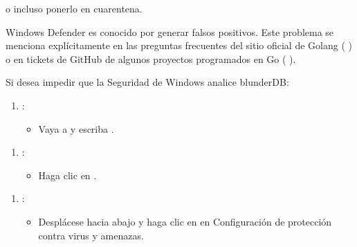 \documentclass[letterpaper,10pt,spanish]{sphinxmanual}
\begin{document}
\begin{figure}[htbp]
\centering

\noindent{}
\end{figure}

\sphinxAtStartPar
o incluso ponerlo en cuarentena.

\sphinxAtStartPar
Windows Defender es conocido por generar falsos positivos. Este problema se menciona explícitamente en las preguntas frecuentes del sitio oficial de Golang (  ) o en tickets de GitHub de algunos proyectos programados en Go (  ).

\sphinxAtStartPar
Si desea impedir que la Seguridad de Windows analice blunderDB:
\begin{enumerate}
%
\item {} 
\sphinxAtStartPar
{}:
\begin{itemize}
\item {} 
\sphinxAtStartPar
Vaya a  y escriba .

\end{itemize}

\end{enumerate}

\begin{figure}[htbp]
\centering

\noindent{}
\end{figure}
\begin{enumerate}
%
\setcounter{enumi}{1}
\item {} 
\sphinxAtStartPar
{}:
\begin{itemize}
\item {} 
\sphinxAtStartPar
Haga clic en .

\end{itemize}

\end{enumerate}

\begin{figure}[htbp]
\centering

\noindent{}
\end{figure}
\begin{enumerate}
%
\setcounter{enumi}{2}
\item {} 
\sphinxAtStartPar
{}:
\begin{itemize}
\item {} 
\sphinxAtStartPar
Desplácese hacia abajo y haga clic en  en Configuración de protección contra virus y amenazas.

\end{itemize}

\end{enumerate}
\end{document}
